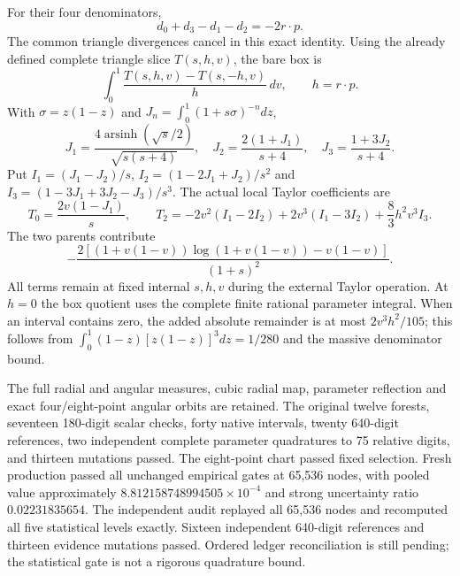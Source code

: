 \documentclass[11pt]{article}
\begin{document}
For their four denominators,
\[
 d_0+d_3-d_1-d_2=-2r\cdot p.
\]
The common triangle divergences cancel in this exact identity. Using
the already defined complete triangle slice $T(s,h,v)$, the bare box is
\[
 \int_0^1\frac{T(s,h,v)-T(s,-h,v)}h\,dv,\qquad h=r\cdot p.
\]
With $\sigma=z(1-z)$ and $J_n=\int_0^1(1+s\sigma)^{-n}dz$,
\[
 J_1=\frac{4\operatorname{arsinh}(\sqrt s/2)}{\sqrt{s(s+4)}},
 \quad J_2=\frac{2(1+J_1)}{s+4},\quad J_3=\frac{1+3J_2}{s+4}.
\]
Put $I_1=(J_1-J_2)/s$, $I_2=(1-2J_1+J_2)/s^2$ and
$I_3=(1-3J_1+3J_2-J_3)/s^3$. The actual local Taylor coefficients are
\[
 T_0=\frac{2v(1-J_1)}s,\qquad
 T_2=-2v^2(I_1-2I_2)+2v^3(I_1-3I_2)+\frac83h^2v^3I_3.
\]
The two parents contribute
\[
 -\frac{2[(1+v(1-v))\log(1+v(1-v))-v(1-v)]}{(1+s)^2}.
\]
All terms remain at fixed internal $s,h,v$ during the external Taylor
operation. At $h=0$ the box quotient uses the complete finite rational
parameter integral. When an interval contains zero, the added absolute
remainder is at most $2v^3h^2/105$; this follows from
$\int_0^1(1-z)[z(1-z)]^3dz=1/280$ and the massive denominator bound.

The full radial and angular measures, cubic radial map, parameter
reflection and exact four/eight-point angular orbits are retained.
The original twelve forests, seventeen 180-digit scalar checks,
forty native intervals, twenty 640-digit references, two independent
complete parameter quadratures to 75 relative digits, and thirteen
mutations passed. The eight-point chart passed fixed selection.
Fresh production passed all unchanged empirical gates at 65,536 nodes,
with pooled value approximately $8.812158748994505\times10^{-4}$ and
strong uncertainty ratio $0.02231835654$.
The independent audit replayed all 65,536 nodes and recomputed all five
statistical levels exactly. Sixteen independent 640-digit references
and thirteen evidence mutations passed. Ordered ledger reconciliation
is still pending; the statistical gate is not a rigorous quadrature bound.
\end{document}
